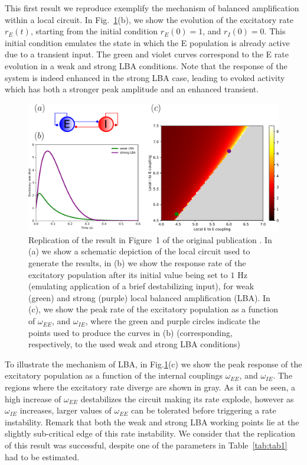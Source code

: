 This first result we reproduce exemplify the mechanism of  balanced amplification within a local circuit. In Fig.~\ref{fig:fig1}(b), we show the evolution of the excitatory rate $r_E(t)$, starting from the initial condition $r_E(0) = 1$, and $r_I(0) = 0$. This initial condition emulates the state in which the E population is already active due to a transient input. The green and violet curves correspond to the E rate evolution in a weak and strong LBA conditions. Note that the response of the system is indeed enhanced in the strong LBA case, leading to evoked activity which has both a stronger peak amplitude and an enhanced transient.


\begin{figure}[!ht]
 \centering
 \includegraphics[scale=0.4]{figures/fig1.pdf}
 \caption{Replication of the result in Figure~1 of the original publication \cite{joglekar2018inter}. In (a) we show a schematic depiction of the local circuit used to generate the results, in (b) we show the response rate of the excitatory population after its initial value being set to $1$ Hz (emulating application of a brief destabilizing input), for weak (green) and strong (purple) local balanced amplification (LBA). In (c), we show the peak rate of the excitatory population as a function of $\omega_{EE}$, and $\omega_{IE}$, where the green and purple circles indicate the points used to produce the curves in (b) (corresponding, respectively, to the used weak and strong LBA conditions) }\label{fig:fig1}
\end{figure}

To illustrate the mechanism of LBA, in Fig.\ref{fig:fig1}(c) we show the peak response of the excitatory population as a function of the internal couplings $\omega_{EE}$, and $\omega_{IE}$. The regions where the excitatory rate diverge are shown in gray. As it can be seen, a high increase of $\omega_{EE}$ destabilizes the circuit making its rate explode, however as $\omega_{IE}$ increases, larger values of  $\omega_{EE}$ can be tolerated before triggering a rate instability. Remark that both the weak and strong LBA working points lie at the slightly sub-critical edge of this rate instability. We consider that the replication of this result was successful, despite one of the parameters in Table~\ref{tab:tab1} had to be estimated.

